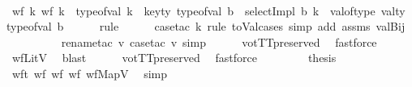 \begin{isabellebody}
\isanewline
\isanewline
\ \ \isamarkupfalse%
\ wf{}{\isacharcolon}{\kern0pt}\ {\isachardoublequoteopen}{\isasymforall}k{\isachardot}{\kern0pt}\ {\isacharparenleft}{\kern0pt}{\isasymnot}wf\ k\ {\isasymor}\ type{\isacharunderscore}{\kern0pt}of{\isacharunderscore}{\kern0pt}val\ k\ {\isasymnoteq}\ key{\isacharunderscore}{\kern0pt}ty\ {\isacharparenleft}{\kern0pt}type{\isacharunderscore}{\kern0pt}of{\isacharunderscore}{\kern0pt}val\ b{\isacharparenright}{\kern0pt}{\isacharparenright}{\kern0pt}\ {\isasymlongrightarrow}\ {\isacharparenleft}{\kern0pt}selectImpl\ b\ k{\isacharparenright}{\kern0pt}\ {\isacharequal}{\kern0pt}\ val{\isacharunderscore}{\kern0pt}of{\isacharunderscore}{\kern0pt}type\ {\isacharparenleft}{\kern0pt}val{\isacharunderscore}{\kern0pt}ty\ {\isacharparenleft}{\kern0pt}type{\isacharunderscore}{\kern0pt}of{\isacharunderscore}{\kern0pt}val\ b{\isacharparenright}{\kern0pt}{\isacharparenright}{\kern0pt}{\isachardoublequoteclose}\isanewline
\ \ \ \ \isamarkupfalse%
\ rule\isanewline
\ \ \ \ \isamarkupfalse%
\ {\isacharparenleft}{\kern0pt}case{\isacharunderscore}{\kern0pt}tac\ k\ rule{\isacharcolon}{\kern0pt}\ toVal{}{}{}{}{\isachardot}{\kern0pt}cases{\isacharsemicolon}{\kern0pt}\ {\isacharparenleft}{\kern0pt}simp\ add{\isacharcolon}{\kern0pt}\ assms\ valBij{}{\isacharparenright}{\kern0pt}{\isacharparenright}{\kern0pt}\isanewline
\ \ \ \ \ \ \ \ \isamarkupfalse%
\ {\isacharparenleft}{\kern0pt}rename{\isacharunderscore}{\kern0pt}tac\ v{\isacharcomma}{\kern0pt}\ case{\isacharunderscore}{\kern0pt}tac\ v{\isacharsemicolon}{\kern0pt}\ simp{\isacharparenright}{\kern0pt}\isanewline
\ \ \ \ \isamarkupfalse%
\ votTTpreserved\ \isamarkupfalse%
\ fastforce\isanewline
\ \ \ \ \isamarkupfalse%
\ wfLitV\ \isamarkupfalse%
\ blast\isanewline
\ \ \ \ \isamarkupfalse%
\ votTTpreserved\ \isamarkupfalse%
\ fastforce{\isacharplus}{\kern0pt}\isanewline
\ \ \ \ \isamarkupfalse%
\isanewline
\isanewline
\ \ \isamarkupfalse%
\ {\isacharquery}{\kern0pt}thesis\ \isamarkupfalse%
\ wft\ wf{}\ wf{}\ wf{}\ wfMapV\ \isamarkupfalse%
\ simp\isanewline
{}\isamarkupfalse%
%
\endisatagproof
{\isafoldproof}%
%
\isadelimproof
\isanewline
%
\endisadelimproof
\isanewline
\isanewline
{}\isamarkupfalse%

\end{isabellebody}
